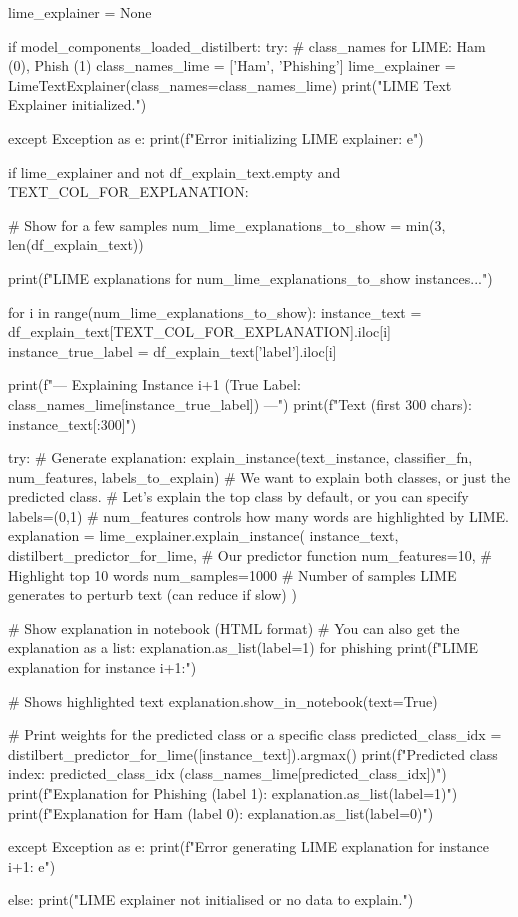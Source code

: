 \begin{ffcode}
lime_explainer = None

if model_components_loaded_distilbert:
    try:
        # class_names for LIME: Ham (0), Phish (1)
        class_names_lime = ['Ham', 'Phishing']
        lime_explainer = LimeTextExplainer(class_names=class_names_lime)
        print("LIME Text Explainer initialized.")

    except Exception as e:
        print(f"Error initializing LIME explainer: {e}")

if lime_explainer and not df_explain_text.empty and TEXT_COL_FOR_EXPLANATION:

    # Show for a few samples
    num_lime_explanations_to_show = min(3, len(df_explain_text))

    print(f"\nGenerating LIME explanations for {num_lime_explanations_to_show} instances...")

    for i in range(num_lime_explanations_to_show):
        instance_text = df_explain_text[TEXT_COL_FOR_EXPLANATION].iloc[i]
        instance_true_label = df_explain_text['label'].iloc[i]

        print(f"\n--- Explaining Instance {i+1} (True Label: {class_names_lime[instance_true_label]}) ---")
        print(f"Text (first 300 chars): {instance_text[:300]}")

        try:
            # Generate explanation: explain_instance(text_instance, classifier_fn, num_features, labels_to_explain)
            # We want to explain both classes, or just the predicted class.
            # Let's explain the top class by default, or you can specify labels=(0,1)
            # num_features controls how many words are highlighted by LIME.
            explanation = lime_explainer.explain_instance(
                instance_text,
                distilbert_predictor_for_lime, # Our predictor function
                num_features=10, # Highlight top 10 words
                num_samples=1000 # Number of samples LIME generates to perturb text (can reduce if slow)
            )

            # Show explanation in notebook (HTML format)
            # You can also get the explanation as a list: explanation.as_list(label=1) for phishing
            print(f"LIME explanation for instance {i+1}:")

            # Shows highlighted text
            explanation.show_in_notebook(text=True)

            # Print weights for the predicted class or a specific class
            predicted_class_idx = distilbert_predictor_for_lime([instance_text]).argmax()
            print(f"Predicted class index: {predicted_class_idx} ({class_names_lime[predicted_class_idx]})")
            print(f"Explanation for Phishing (label 1): {explanation.as_list(label=1)}")
            print(f"Explanation for Ham (label 0): {explanation.as_list(label=0)}")

        except Exception as e:
            print(f"Error generating LIME explanation for instance {i+1}: {e}")

else:
    print("LIME explainer not initialised or no data to explain.")
\end{ffcode}